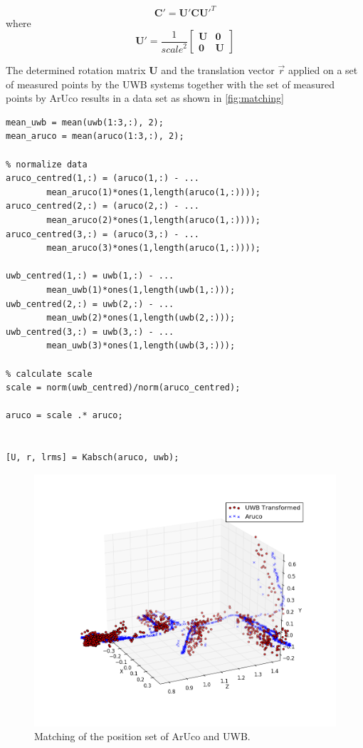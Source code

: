 \begin{equation}
	\textbf{C}' = \textbf{U}' \textbf{C} \textbf{U}'^T
\end{equation}
where
\begin{equation}
	\textbf{U}' = \frac{1}{\mathit{scale}^2}
	\begin{bmatrix}
		\textbf{U} & \textbf{0} \\
		\textbf{0} & \textbf{U}
	\end{bmatrix}
\end{equation}

The determined rotation matrix $\textbf{U}$ and the translation vector $\vec r$ applied on a set of measured points by the \ac{UWB} systems together with the set of measured points by ArUco results in a data set as shown in \autoref{fig:matching}

\lstset{language=Matlab}
\begin{lstlisting}[frame=single, caption=Matching proceeder, label=lst:matching]
% Calculate mean
mean_uwb = mean(uwb(1:3,:), 2);
mean_aruco = mean(aruco(1:3,:), 2);
	
% normalize data	
aruco_centred(1,:) = (aruco(1,:) - ...
		mean_aruco(1)*ones(1,length(aruco(1,:))));
aruco_centred(2,:) = (aruco(2,:) - ...
		mean_aruco(2)*ones(1,length(aruco(1,:))));
aruco_centred(3,:) = (aruco(3,:) - ...
		mean_aruco(3)*ones(1,length(aruco(1,:))));

uwb_centred(1,:) = uwb(1,:) - ...
		mean_uwb(1)*ones(1,length(uwb(1,:)));
uwb_centred(2,:) = uwb(2,:) - ...
		mean_uwb(2)*ones(1,length(uwb(2,:)));
uwb_centred(3,:) = uwb(3,:) - ...
		mean_uwb(3)*ones(1,length(uwb(3,:)));
	
% calculate scale
scale = norm(uwb_centred)/norm(aruco_centred);
	
aruco = scale .* aruco;
	
	
[U, r, lrms] = Kabsch(aruco, uwb);
\end{lstlisting}



\begin{figure}[ht!]\centering
	\includegraphics[width=1.0\textwidth]{figures/matching}
	\caption{Matching of the position set of ArUco and \ac{UWB}.}\label{fig:matching}
\end{figure} 

